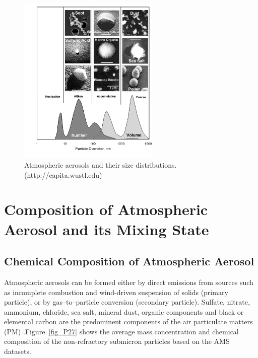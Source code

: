 \documentclass[12pt, fullpage]{uiucthesis2009}
\begin{document}
		\begin{figure}[h] 
			\begin{center}
				\includegraphics[width = 0.6\textwidth]{Figure26}
				\caption[Atmospheric aerosols and their size distributions]{\label{fig_P26} Atmospheric aerosols and their size distributions. \\ (http://capita.wustl.edu)}
			\end{center}
		\end{figure}

	\section{Composition of Atmospheric Aerosol and its Mixing State}
	\subsection{Chemical Composition of Atmospheric Aerosol}
	Atmospheric aerosols can be formed either by direct emissions from sources such as incomplete combustion and wind-driven suspension of solids (primary particle), or by gas--to--particle conversion (secondary particle). Sulfate, nitrate, ammonium, chloride, sea salt, mineral dust, organic components and black or elemental carbon are the predominent components of the air particulate matters (PM) \citep{poschl2005}.Figure~\ref{fig_P27} shows the average mass concentration and chemical composition of the non-refractory submicron particles based on the AMS datasets.
	
\end{document}
